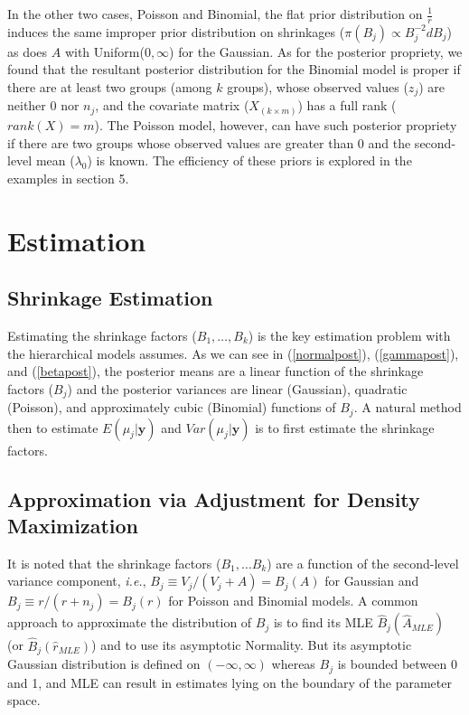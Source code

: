 \documentclass[article]{jss}
\begin{document}
In the other two cases, Poisson and Binomial, the flat prior distribution on $\frac{1}{r}$ induces the same improper prior distribution on shrinkages ($\pi(B_{j})\propto B_{j}^{-2} d B_j$) as does $A$ with Uniform($0, \infty$) for the Gaussian. As for the posterior propriety, we found that the resultant posterior distribution for the Binomial model is proper if there are at least two groups (among $k$ groups), whose observed values ($z_{j}$) are neither 0 nor $n_j$,  and the covariate matrix ($X_{(k\times m )}$) has a full rank ($rank(X)=m$). The Poisson model, however, can have such posterior propriety if there are two groups whose observed values are greater than 0 and the second-level mean ($\lambda_0$) is known. The efficiency of these priors is explored in the examples in section 5.



\section[Estimation]{Estimation}

\subsection[Shrinkage Estimation]{Shrinkage Estimation}
Estimating the shrinkage factors ($B_1, \ldots, B_k$) is the key estimation problem with the hierarchical models  assumes. As we can see in (\ref{normalpost}), (\ref{gammapost}), and (\ref{betapost}), the posterior means are a linear function of the shrinkage factors ($B_{j}$) and the posterior variances are linear (Gaussian), quadratic (Poisson), and  approximately cubic (Binomial) functions of $B_{j}$. A natural method then to estimate $E(\mu_{j}\vert \textbf{y})$ and $Var(\mu_{j}\vert \textbf{y})$ is to first estimate the shrinkage factors.

\subsection[ADM]{Approximation via Adjustment for Density Maximization}\label{ADM}
It is noted that the shrinkage factors ($B_1, \ldots B_k$) are a function of the second-level variance component, \emph{i.e.}, $B_{j}\equiv V_{j}/(V_{j}+A)=B_{j}(A)$ for Gaussian and $B_{j}\equiv r/(r+n_{j})=B_{j}(r)$ for Poisson and Binomial models. A common approach to approximate the distribution of $B_{j}$ is to find its MLE $\hat{B}_{j}(\hat{A}_{MLE})$ (or  $\hat{B}_{j}(\hat{r}_{MLE})$) and to use its asymptotic Normality. But its asymptotic Gaussian distribution is defined on $(-\infty, \infty)$ whereas $B_{j}$ is bounded between 0 and 1, and MLE can result in estimates lying on the boundary of the parameter space.
\end{document}
